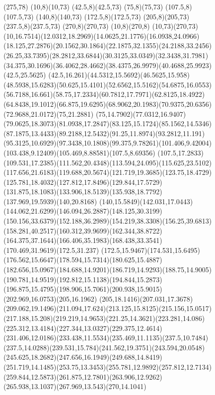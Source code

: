 \documentclass[10pt,a5paper,oneside,draft]{book}
\numberwithin{equation}{chapter}
\begin{document}
\begin{figure} %
	\begin{picture}(275,78)
		\thinlines
		\drawline(10,8)(10,73)
		\drawline(42.5,8)(42.5,73)
		\drawline(75,8)(75,73)
		\drawline(107.5,8)(107.5,73)
		\drawline(140,8)(140,73)
		\drawline(172.5,8)(172.5,73)
		\drawline(205,8)(205,73)
		\drawline(237.5,8)(237.5,73)
		\drawline(270,8)(270,73)
		\drawline(10,8)(270,8)
		\drawline(10,73)(270,73)
		\thicklines
		\drawline(10,16.7514)(12.0312,18.2969)(14.0625,21.1776)(16.0938,24.0966)(18.125,27.2876)(20.1562,30.1864)(22.1875,32.1355)(24.2188,33.2456)(26.25,33.7395)(28.2812,33.6844)(30.3125,33.0349)(32.3438,31.7981)(34.375,30.1696)(36.4062,28.4662)(38.4375,26.9979)(40.4688,25.9923)(42.5,25.5625)
		\drawline(42.5,16.261)(44.5312,15.5692)(46.5625,15.958)(48.5938,15.6283)(50.625,15.4101)(52.6562,15.5162)(54.6875,16.0553)(56.7188,16.661)(58.75,17.2334)(60.7812,17.7971)(62.8125,18.4922)(64.8438,19.1012)(66.875,19.6295)(68.9062,20.1983)(70.9375,20.6356)(72.9688,21.0172)(75,21.2881)
		\drawline(75,14.7902)(77.0312,16.9407)(79.0625,18.3073)(81.0938,17.2847)(83.125,15.1724)(85.1562,14.5346)(87.1875,13.4433)(89.2188,12.5432)(91.25,11.8974)(93.2812,11.191)(95.3125,10.6929)(97.3438,10.1808)(99.375,9.78261)(101.406,9.42004)(103.438,9.12409)(105.469,8.88581)(107.5,8.69356)
		\drawline(107.5,17.2833)(109.531,17.2385)(111.562,20.4348)(113.594,24.095)(115.625,23.5102)(117.656,21.6183)(119.688,20.5674)(121.719,19.3685)(123.75,18.4729)(125.781,18.4032)(127.812,17.8496)(129.844,17.5729)(131.875,18.1083)(133.906,18.5139)(135.938,18.7792)(137.969,19.5939)(140,20.8168)
		\drawline(140,15.5849)(142.031,17.0443)(144.062,21.6299)(146.094,26.2887)(148.125,30.3199)(150.156,33.6379)(152.188,36.2989)(154.219,38.3308)(156.25,39.6813)(158.281,40.2517)(160.312,39.9699)(162.344,38.8722)(164.375,37.1644)(166.406,35.1983)(168.438,33.3541)(170.469,31.9619)(172.5,31.237)
		\drawline(172.5,15.9467)(174.531,15.6495)(176.562,15.6647)(178.594,15.7314)(180.625,15.4887)(182.656,15.0967)(184.688,14.9201)(186.719,14.9293)(188.75,14.9005)(190.781,14.9519)(192.812,15.1138)(194.844,15.2873)(196.875,15.4795)(198.906,15.7061)(200.938,15.9015)(202.969,16.0753)(205,16.1962)
		\drawline(205,18.1416)(207.031,17.3678)(209.062,19.1496)(211.094,17.624)(213.125,15.8125)(215.156,15.0517)(217.188,15.208)(219.219,14.9653)(221.25,14.3621)(223.281,14.086)(225.312,13.4184)(227.344,13.0327)(229.375,12.4614)(231.406,12.0186)(233.438,11.5534)(235.469,11.1135)(237.5,10.7484)
		\drawline(237.5,14.0288)(239.531,15.784)(241.562,19.3751)(243.594,20.0548)(245.625,18.2682)(247.656,16.1949)(249.688,14.8419)(251.719,14.1485)(253.75,13.3453)(255.781,12.9892)(257.812,12.7134)(259.844,12.5873)(261.875,12.7801)(263.906,12.9262)(265.938,13.1037)(267.969,13.543)(270,14.1041)

\end{picture}
\end{figure}
\end{document}

